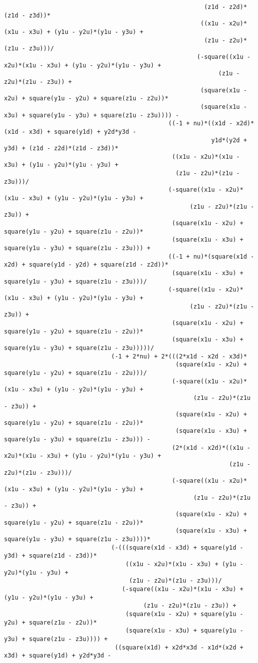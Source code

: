 \begin{lstlisting}
														(z1d - z2d)*(z1d - z3d))*
													   ((x1u - x2u)*(x1u - x3u) + (y1u - y2u)*(y1u - y3u) + 
														(z1u - z2u)*(z1u - z3u)))/
													  (-square((x1u - x2u)*(x1u - x3u) + (y1u - y2u)*(y1u - y3u) + 
															(z1u - z2u)*(z1u - z3u)) + 
													   (square(x1u - x2u) + square(y1u - y2u) + square(z1u - z2u))*
													   (square(x1u - x3u) + square(y1u - y3u) + square(z1u - z3u)))) - 
											  ((-1 + nu)*((x1d - x2d)*(x1d - x3d) + square(y1d) + y2d*y3d - 
														  y1d*(y2d + y3d) + (z1d - z2d)*(z1d - z3d))*
											   ((x1u - x2u)*(x1u - x3u) + (y1u - y2u)*(y1u - y3u) + 
												(z1u - z2u)*(z1u - z3u)))/
											  (-square((x1u - x2u)*(x1u - x3u) + (y1u - y2u)*(y1u - y3u) + 
													(z1u - z2u)*(z1u - z3u)) + 
											   (square(x1u - x2u) + square(y1u - y2u) + square(z1u - z2u))*
											   (square(x1u - x3u) + square(y1u - y3u) + square(z1u - z3u))) + 
											  ((-1 + nu)*(square(x1d - x2d) + square(y1d - y2d) + square(z1d - z2d))*
											   (square(x1u - x3u) + square(y1u - y3u) + square(z1u - z3u)))/
											  (-square((x1u - x2u)*(x1u - x3u) + (y1u - y2u)*(y1u - y3u) + 
													(z1u - z2u)*(z1u - z3u)) + 
											   (square(x1u - x2u) + square(y1u - y2u) + square(z1u - z2u))*
											   (square(x1u - x3u) + square(y1u - y3u) + square(z1u - z3u)))))/
							  (-1 + 2*nu) + 2*(((2*x1d - x2d - x3d)*
												(square(x1u - x2u) + square(y1u - y2u) + square(z1u - z2u)))/
											   (-square((x1u - x2u)*(x1u - x3u) + (y1u - y2u)*(y1u - y3u) + 
													 (z1u - z2u)*(z1u - z3u)) + 
												(square(x1u - x2u) + square(y1u - y2u) + square(z1u - z2u))*
												(square(x1u - x3u) + square(y1u - y3u) + square(z1u - z3u))) - 
											   (2*(x1d - x2d)*((x1u - x2u)*(x1u - x3u) + (y1u - y2u)*(y1u - y3u) + 
															   (z1u - z2u)*(z1u - z3u)))/
											   (-square((x1u - x2u)*(x1u - x3u) + (y1u - y2u)*(y1u - y3u) + 
													 (z1u - z2u)*(z1u - z3u)) + 
												(square(x1u - x2u) + square(y1u - y2u) + square(z1u - z2u))*
												(square(x1u - x3u) + square(y1u - y3u) + square(z1u - z3u))))*
							  (-(((square(x1d - x3d) + square(y1d - y3d) + square(z1d - z3d))*
								  ((x1u - x2u)*(x1u - x3u) + (y1u - y2u)*(y1u - y3u) + 
								   (z1u - z2u)*(z1u - z3u)))/
								 (-square((x1u - x2u)*(x1u - x3u) + (y1u - y2u)*(y1u - y3u) + 
									   (z1u - z2u)*(z1u - z3u)) + 
								  (square(x1u - x2u) + square(y1u - y2u) + square(z1u - z2u))*
								  (square(x1u - x3u) + square(y1u - y3u) + square(z1u - z3u)))) + 
							   ((square(x1d) + x2d*x3d - x1d*(x2d + x3d) + square(y1d) + y2d*y3d - 

\end{lstlisting}
